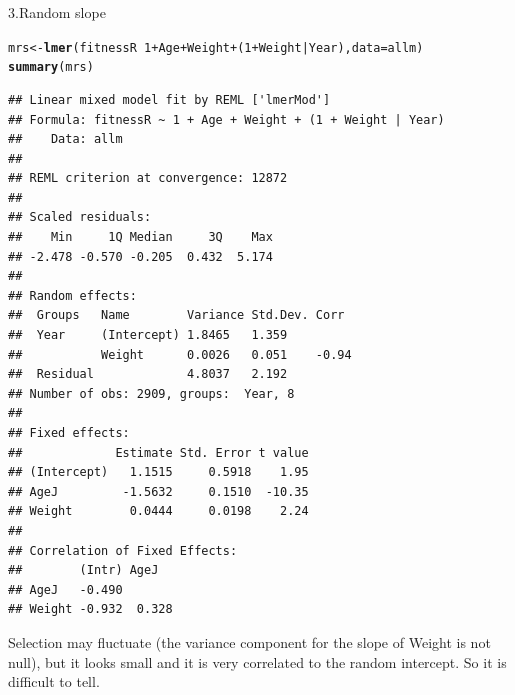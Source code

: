 \documentclass[12pt,a4paper]{scrartcl}\usepackage[]{graphicx}\usepackage[]{color}
\makeatletter
\newcommand{\hlnum}[1]{\textcolor[rgb]{0.686,0.059,0.569}{#1}}%
\newcommand{\hlopt}[1]{\textcolor[rgb]{0,0,0}{#1}}%
\newcommand{\hlstd}[1]{\textcolor[rgb]{0.345,0.345,0.345}{#1}}%
\newcommand{\hlkwb}[1]{\textcolor[rgb]{0.69,0.353,0.396}{#1}}%
\newcommand{\hlkwc}[1]{\textcolor[rgb]{0.333,0.667,0.333}{#1}}%
\newcommand{\hlkwd}[1]{\textcolor[rgb]{0.737,0.353,0.396}{\textbf{#1}}}%
\newenvironment{kframe}{%
 \def\at@end@of@kframe{}%
 \ifinner\ifhmode%
  \def\at@end@of@kframe{\end{minipage}}%
  \begin{minipage}{\columnwidth}%
 \fi\fi%
 \def\FrameCommand##1{\hskip\@totalleftmargin \hskip-\fboxsep
 \colorbox{shadecolor}{##1}\hskip-\fboxsep
     \hskip-\linewidth \hskip-\@totalleftmargin \hskip\columnwidth}%
 \MakeFramed {\advance\hsize-\width
   \@totalleftmargin\z@ \linewidth\hsize
   \@setminipage}}%
 {\par\unskip\endMakeFramed%
 \at@end@of@kframe}
\newenvironment{knitrout}{}{} %
\makeatother
\begin{document}
\begin{Answer}
3.Random slope
\begin{knitrout}
\color{fgcolor}\begin{kframe}
\begin{alltt}
\hlstd{mrs} \hlkwb{<-} \hlkwd{lmer}\hlstd{(fitnessR} \hlopt{~} \hlnum{1}\hlopt{+} \hlstd{Age}  \hlopt{+} \hlstd{Weight}  \hlopt{+} \hlstd{(}\hlnum{1}\hlopt{+} \hlstd{Weight}\hlopt{|}\hlstd{Year),} \hlkwc{data} \hlstd{= allm)}
\hlkwd{summary}\hlstd{(mrs)}
\end{alltt}
\begin{verbatim}
## Linear mixed model fit by REML ['lmerMod']
## Formula: fitnessR ~ 1 + Age + Weight + (1 + Weight | Year)
##    Data: allm
## 
## REML criterion at convergence: 12872
## 
## Scaled residuals: 
##    Min     1Q Median     3Q    Max 
## -2.478 -0.570 -0.205  0.432  5.174 
## 
## Random effects:
##  Groups   Name        Variance Std.Dev. Corr 
##  Year     (Intercept) 1.8465   1.359         
##           Weight      0.0026   0.051    -0.94
##  Residual             4.8037   2.192         
## Number of obs: 2909, groups:  Year, 8
## 
## Fixed effects:
##             Estimate Std. Error t value
## (Intercept)   1.1515     0.5918    1.95
## AgeJ         -1.5632     0.1510  -10.35
## Weight        0.0444     0.0198    2.24
## 
## Correlation of Fixed Effects:
##        (Intr) AgeJ  
## AgeJ   -0.490       
## Weight -0.932  0.328
\end{verbatim}
\end{kframe}
\end{knitrout}
Selection may fluctuate (the variance component for the slope of Weight is not null), but it looks small and it is very correlated to the random intercept. So it is difficult to tell.\\


\end{Answer}
\end{document}
